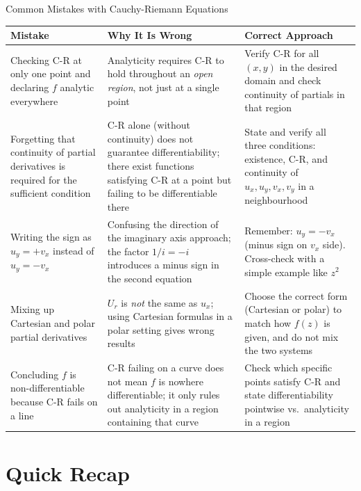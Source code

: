 \documentclass[12pt,a4paper]{article}
\begin{document}
\begin{mistakebox}{Common Mistakes with Cauchy-Riemann Equations}
\begin{center}
\begin{tabular}{p{4.5cm} p{4.5cm} p{4.5cm}}
\toprule
\textbf{Mistake} & \textbf{Why It Is Wrong} & \textbf{Correct Approach} \\
\midrule
Checking C-R at only one point and declaring $f$ analytic everywhere &
Analyticity requires C-R to hold throughout an \emph{open region}, not just at a single point &
Verify C-R for all $(x,y)$ in the desired domain and check continuity of partials in that region \\
\midrule
Forgetting that continuity of partial derivatives is required for the sufficient condition &
C-R alone (without continuity) does not guarantee differentiability; there exist functions satisfying C-R at a point but failing to be differentiable there &
State and verify all three conditions: existence, C-R, and continuity of $u_x, u_y, v_x, v_y$ in a neighbourhood \\
\midrule
Writing the sign as $u_y = +v_x$ instead of $u_y = -v_x$ &
Confusing the direction of the imaginary axis approach; the factor $1/i = -i$ introduces a minus sign in the second equation &
Remember: $u_y = -v_x$ (minus sign on $v_x$ side). Cross-check with a simple example like $z^2$ \\
\midrule
Mixing up Cartesian and polar partial derivatives &
$U_r$ is \emph{not} the same as $u_x$; using Cartesian formulas in a polar setting gives wrong results &
Choose the correct form (Cartesian or polar) to match how $f(z)$ is given, and do not mix the two systems \\
\midrule
Concluding $f$ is non-differentiable because C-R fails on a line &
C-R failing on a curve does not mean $f$ is nowhere differentiable; it only rules out analyticity in a region containing that curve &
Check which specific points satisfy C-R and state differentiability pointwise vs.\ analyticity in a region \\
\bottomrule
\end{tabular}
\end{center}
\end{mistakebox}

\section{Quick Recap}
\end{document}
